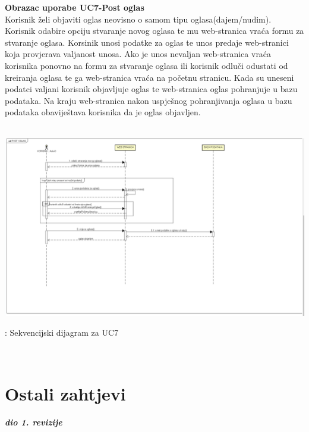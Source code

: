 			    \noindent\textbf{Obrazac uporabe UC7-Post oglas}\\
			    Korisnik želi objaviti oglas neovisno o samom tipu oglasa(dajem/nudim). Korisnik odabire opciju stvaranje novog oglasa te mu web-stranica vraća formu za stvaranje oglasa. Korsinik unosi podatke za oglas te unos predaje web-stranici koja provjerava valjanost unosa. Ako je unos nevaljan web-stranica vraća korisnika ponovno na formu za stvaranje oglasa ili korisnik odluči odustati od kreiranja oglasa te ga web-stranica vraća na početnu stranicu. Kada su uneseni podatci valjani korisnik objavljuje oglas te web-stranica oglas pohranjuje u bazu podataka. Na kraju web-stranica nakon uspješnog pohranjivanja oglasa u bazu podataka obaviještava korisnika da je oglas objavljen.
			    \\
			    \\
			    \begin{fig}
			   
				    \graphicspath{ {slike/} }
  
                    \centering
                    \includegraphics[width=\textwidth]{POST OGLAS.png}
                    \caption{: Sekvencijski dijagram za UC7}
                \end{fig}
			\eject

				\
	
		\section{Ostali zahtjevi}
		
			\textbf{\textit{dio 1. revizije}}\\
		 
